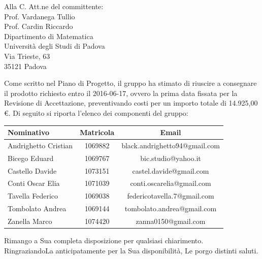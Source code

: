 \documentclass[a4paper,12pt]{letteracdp}
\begin{document}
\begin{letter}{
		Alla C. Att.ne del committente: \\
		Prof. Vardanega Tullio \\
		Prof. Cardin Riccardo \\
		Dipartimento di Matematica \\
		Università degli Studi di Padova \\
		Via Trieste, 63 \\
		35121 Padova}
\begin{itemize}
\end{itemize}

Come scritto nel Piano di Progetto, il gruppo ha stimato di riuscire a consegnare il prodotto richiesto entro il 2016-06-17, ovvero la prima data fissata per la Revisione di Accettazione, preventivando costi per un importo totale di 14.925,00 \euro.
\newpage
Di seguito si riporta l'elenco dei componenti del gruppo:

\begin{center}
		\begin{tabular}{l c c}
			\toprule
			\textbf{Nominativo} & \textbf{Matricola} & \textbf{Email} \\
			\midrule
			Andrighetto Cristian & 1069882 & black.andrighetto94@gmail.com \\
			Bicego Eduard & 1069767 & bic.studio@yahoo.it  \\
			Castello Davide	& 1073151 &	 castel.davide@gmail.com\\
			Conti Oscar Elia & 1071039 & conti.oscarelia@gmail.com \\
			Tavella Federico & 1069038 & federicotavella.7@gmail.com\\
			Tombolato Andrea & 1069144 & tombolato.andrea@gmail.com	 \\
			Zanella Marco & 1074420 & zanna0150@gmail.com \\
			\bottomrule
		\end{tabular}
\end{center}
		
		\closing{Rimango a Sua completa disposizione per qualsiasi chiarimento. \\
		RingraziandoLa anticipatamente per la Sua disponibilità, Le porgo distinti saluti.}
		
	\end{letter}
\end{document}
